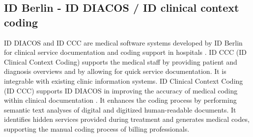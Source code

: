 \subsection{ID Berlin - ID DIACOS / ID clinical context coding}\label{subsec:id-berlin---id-clinical-context-coding}
ID DIACOS and ID CCC are medical software systems developed by ID Berlin for clinical service documentation and coding support in hospitals \cite{IDBerlin2023}.
ID CCC (ID Clinical Context Coding) supports the medical staff by providing patient and diagnosis overviews and by allowing for quick service documentation.
It is integrable with existing clinic information systems.
ID Clinical Context Coding (ID CCC) supports ID DIACOS in improving the accuracy of medical coding within clinical documentation \cite{IDBerlin2023}.
It enhances the coding process by performing semantic text analyses of digital and digitized human-readable documents.
It identifies hidden services provided during treatment and generates medical codes, supporting the manual coding process of billing professionals.

